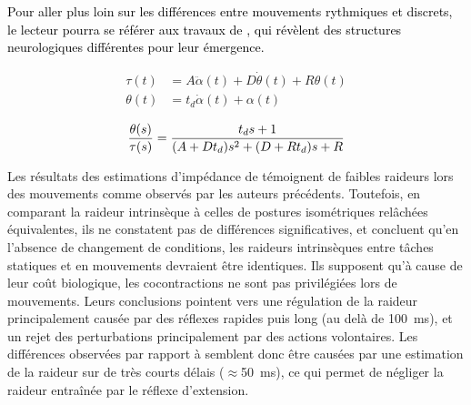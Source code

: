 \textcolor{black}{Pour aller plus loin sur les différences entre mouvements rythmiques et discrets, le lecteur pourra se référer aux travaux de \textcite{schaal_rhythmic_2004,hogan_rhythmic_2007,degallier_modeling_2010}, qui révèlent des structures neurologiques différentes pour leur émergence.}


\begin{equation} \label{eq_impedance_popescu_2003}
	\begin{split}
		\tau(t) &= A\ddot{\alpha}(t) + D\dot{\theta}(t) + R\theta(t) \\
		\theta(t) &= t_d \dot{\alpha}(t) + \alpha(t)
	\end{split}
\end{equation}

\begin{equation} \label{eq_impedance_model_popescu_2003}
	\textcolor{black}{\frac{\theta(s)}{\tau(s)} = \frac{t_ds+1}{(A + Dt_d)s^2 + (D + Rt_d)s + R}}
\end{equation}

Les résultats des estimations d'impédance de \textcite{popescu_elbow_2003} témoignent de faibles raideurs lors des mouvements comme observés par les auteurs précédents. Toutefois, en comparant la raideur intrinsèque à celles de postures isométriques relâchées équivalentes, ils ne constatent pas de différences significatives, et concluent qu'en l'absence de changement de conditions, les raideurs intrinsèques entre tâches statiques et en mouvements devraient être identiques. Ils supposent qu'à cause de leur coût biologique, les cocontractions ne sont pas privilégiées lors de mouvements. Leurs conclusions pointent vers une régulation de la raideur principalement causée par des réflexes rapides puis long (au delà de \SI{100}{\milli\second}), et un rejet des perturbations principalement par des actions volontaires. Les différences observées par rapport à \textcite{bennett_time-varying_1992} semblent donc être causées par une estimation de la raideur sur de très courts délais ($\approx$\SI{50}{\milli\second}), ce qui permet de négliger la raideur entraînée par le réflexe d'extension.

